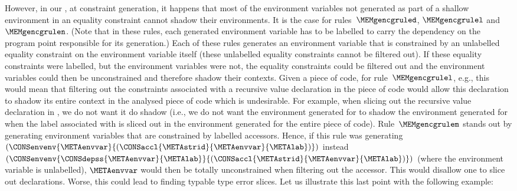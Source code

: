 \documentclass{jfp1}
\begin{document}
However, in our \TES, at constraint generation, it happens that most of
the environment variables not generated as part of a shallow
environment in an equality constraint cannot shadow their
environments.  It is the case for rules~$\MEMgencgruled$,
$\MEMgencgrulel$ and~$\MEMgencgrulen$.
%
(Note that in these rules, each generated environment variable has to
be labelled to carry the dependency on the program point responsible
for its generation.)
%
Each of these rules generates an environment variable that is
constrained by an unlabelled equality constraint on the environment
variable itself (these unlabelled equality constraints cannot be
filtered out).  If these equality constraints were labelled, but the
environment variables were not, the equality constraints could be
filtered out and the environment variables could then be unconstrained
and therefore shadow their contexts.
%
Given a piece of code, for rule~$\MEMgencgrulel$, e.g., this would
mean that filtering out the constraints associated with a recursive
value declaration in the piece of code would allow this declaration to
shadow its entire context in the analysed piece of code which is
undesirable.  For example, when slicing out the recursive value
declaration in
%
,
%
we do not want it do shadow  (i.e., we do not
want
the environment generated for  to
shadow the environment generated for  when
the label associated with  is
sliced out in the environment generated for the entire piece of code).
%
%
Rule~$\MEMgencgrulem$ stands out by generating environment variables
that are constrained by labelled accessors.  Hence, if this rule was
generating
$(\CONSenvenv{\METAenvvar}{(\CONSaccl{\METAstrid}{\METAenvvar}{\METAlab})})$
instead
$(\CONSenvenv{\CONSdepss{\METAenvvar}{\METAlab}}{(\CONSaccl{\METAstrid}{\METAenvvar}{\METAlab})})$
(where the environment variable is unlabelled), $\METAenvvar$ would
then be totally unconstrained when filtering out the accessor.  This
would disallow one to slice out  declarations.
Worse, this could lead to finding typable type error slices.  Let us
illustrate this last point with the following example:


\end{document}
